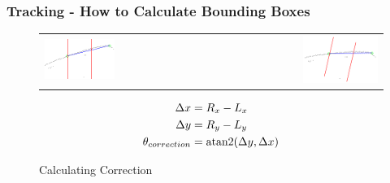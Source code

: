 \documentclass[nosymbols]{beamer}	%
\begin{document}
\begin{frame}
\frametitle{Tracking - How to Calculate Bounding Boxes}
\begin{figure}[!ht]
\caption{Calculating Correction}
\begin{tabular}{ l r }
 \includegraphics[width=0.45\textwidth,height=0.7\textheight,keepaspectratio]{bilder/obst_devide_angle.png} &
 \includegraphics[width=0.45\textwidth,height=0.7\textheight,keepaspectratio]{bilder/obst_devide_angle_rot.png}
\end{tabular}
\begin{align*}
\Delta x &= R_x - L_x\\
\Delta y &= R_y - L_y\\
\theta_{correction} &= \operatorname{atan2}(\Delta y,\Delta x)
\end{align*}
\label{segments}
\end{figure}
\end{frame}
\end{document}

